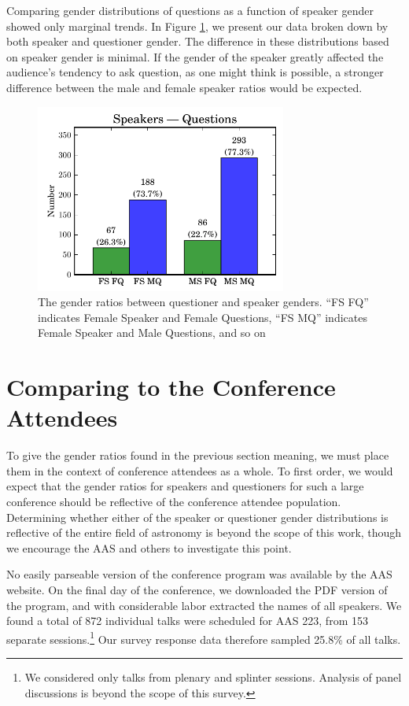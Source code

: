 \documentclass[iop]{emulateapj}
\begin{document}
Comparing gender distributions of questions as a function of speaker gender showed only marginal trends. In Figure \ref{fig:sq}, we present our data broken down by both speaker and questioner gender. The difference in these distributions based on speaker gender is minimal.  If the gender of the speaker greatly affected the audience's tendency to ask question, as one might think is possible, a stronger difference between the male and female speaker ratios would be expected. 



\begin{figure}[!th]
\centering
\includegraphics[width=3.25in]{speakers_questions}
\caption{The gender ratios between questioner and speaker genders. ``FS FQ'' indicates Female Speaker and Female Questions, ``FS MQ'' indicates Female Speaker and Male Questions, and so on}
\label{fig:sq}
\end{figure}




\section{Comparing to the Conference Attendees} 
To give the gender ratios found in the previous section meaning, we must place them in the context of conference attendees as a whole. To first order, we would expect that the gender ratios for speakers and questioners for such a large conference should be reflective of the conference attendee population. Determining whether either of the speaker or questioner gender distributions is reflective of the entire field of astronomy is beyond the scope of this work, though we encourage the AAS and others to investigate this point.


No easily parseable version of the conference program was available by the AAS website. %
On the final day of the conference, we downloaded the PDF version of the program, and with considerable labor extracted the names of all speakers. We found a total of 872 individual talks were scheduled for AAS 223, from 153 separate sessions.\footnote{We considered only talks from plenary and splinter sessions. Analysis of panel discussions is beyond the scope of this survey.} Our survey response data therefore sampled 25.8\% of all talks.
\end{document}
